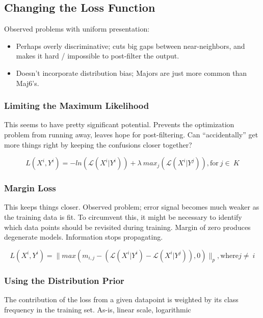 \subsection{Changing the Loss Function}

Observed problems with uniform presentation:
\begin{itemize}
\item Perhaps overly discriminative; cuts big gaps between near-neighbors, and makes it hard / impossible to post-filter the output.
\item Doesn't incorporate distribution bias; Majors are just more common than Maj6's.
\end{itemize}


\subsubsection{Limiting the Maximum Likelihood}

This seems to have pretty significant potential.
Prevents the optimization problem from running away, leaves hope for post-filtering.
Can ``accidentally'' get more things right by keeping the confusions closer together?

\begin{equation}
L(X^i, Y^i) = -ln(\mathcal{L}(X^i|Y^i)) + \lambda~max_j(\mathcal{L}(X^i|Y^j)), \text{for}~ j\in~K
\label{eq:collisions}
\end{equation}


\subsubsection{Margin Loss}
This keeps things closer.
Observed problem; error signal becomes much weaker as the training data is fit.
To circumvent this, it might be necessary to identify which data points should be revisited during training.
Margin of zero produces degenerate models. Information stops propagating.

\begin{equation}
L(X^i, Y^i) = \| max(m_{i,j} - (\mathcal{L}(X^i|Y^i) - \mathcal{L}(X^i|Y^j)), 0) \|_p, \text{where} j\neq~i
\label{eq:collisions}
\end{equation}


\subsubsection{Using the Distribution Prior}
The contribution of the loss from a given datapoint is weighted by its class frequency in the training set.
As-is, linear scale, logarithmic

